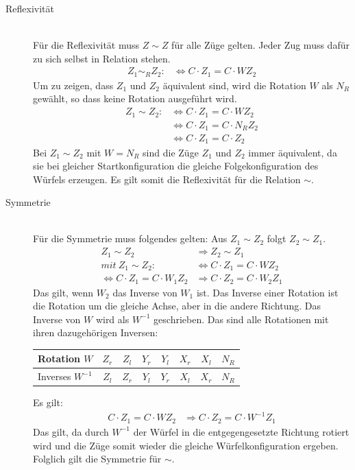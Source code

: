 \documentclass[12pt,a4paper, usenames, dvipsnames]{article}
\theoremstyle{mystyle}
\theoremstyle{definition}
\begin{document}
\begin{description}


\item [Reflexivität] \ \\
Für die Reflexivität muss $Z \sim Z$ für alle Züge gelten. Jeder Zug muss dafür zu sich selbst in Relation stehen.
\begin{align*}
Z_1 \sim_R Z_2 : & \Leftrightarrow C \cdot Z_1 = C \cdot WZ_2
\end{align*}
Um zu zeigen, dass $Z_1$ und $Z_2$ äquivalent sind, wird die Rotation $W$ als $N_R$ gewählt, so dass keine Rotation ausgeführt wird.
\begin{align*}
Z_1 \sim Z_2 : & \Leftrightarrow  C \cdot Z_1 = C \cdot WZ_2 \\
\ & \Leftrightarrow C \cdot Z_1=C \cdot N_R Z_2 \\
\ & \Leftrightarrow C \cdot Z_1 = C \cdot Z_2
\end{align*}
Bei $Z_1 \sim Z_2$ mit $W=N_R$ sind die Züge $Z_1$ und $Z_2$ immer äquivalent, da sie bei gleicher Startkonfiguration die gleiche Folgekonfiguration des Würfels erzeugen. Es gilt somit die Reflexivität für die Relation $\sim$.

\item [Symmetrie] \ \\
Für die Symmetrie muss folgendes gelten: Aus $Z_1 \sim Z_2$ folgt $Z_2 \sim Z_1$.
\begin{align*}
Z_1 \sim Z_2 & \Rightarrow Z_2 \sim Z_1 \\
mit \ Z_1 \sim Z_2 : & \Leftrightarrow  C \cdot  Z_1 = C \cdot  WZ_2 \\
\Leftrightarrow C \cdot  Z_1 = C \cdot  W_1 Z_2 & \Rightarrow C \cdot  Z_2 = C \cdot  W_2 Z_1
\end{align*}
Das gilt, wenn $W_2$ das Inverse von $W_1$ ist. Das Inverse einer Rotation ist die Rotation um die gleiche Achse, aber in die andere Richtung. 
Das Inverse von $W$ wird als $W^{-1}$ geschrieben.
Das sind alle Rotationen mit ihren dazugehörigen Inversen:

\begin{center}
\begin{tabular}{lccccccc}
Rotation $W$ & ${Z_r}$ & ${Z_l}$ &  ${Y_r}$ & ${Y_l}$ & ${X_r}$ & ${X_l}$ & $N_R$ \\
\hline
Inverses \hspace*{0.1em} $W^{-1}$ & ${Z_l}$ & ${Z_r}$ &  ${Y_l}$ & ${Y_r}$ & ${X_l}$ & ${X_r}$ & $N_R$ \\
\end{tabular} 
\end{center}
Es gilt: 
\begin{align*}
C \cdot  Z_1 = C \cdot  W Z_2 & \Rightarrow C \cdot  Z_2 = C \cdot  W^{-1} Z_1
\end{align*}
Das gilt, da durch $W^{-1}$ der Würfel in die entgegengesetzte Richtung rotiert wird und die Züge somit wieder die gleiche Würfelkonfiguration ergeben.
Folglich gilt die Symmetrie für $\sim$.



\end{description}
\end{document}
